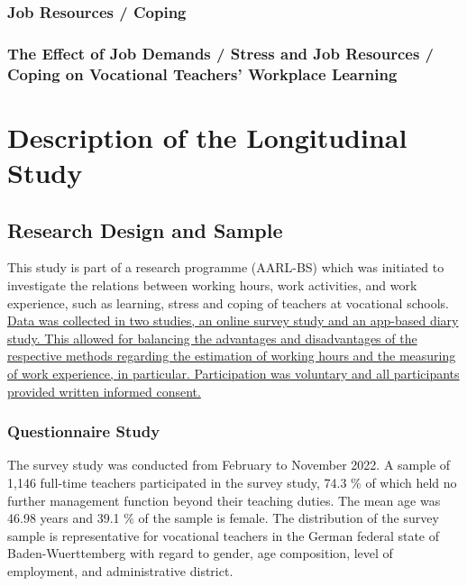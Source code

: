 \documentclass[
]{article}
\begin{document}
\subsubsection{Job Resources / Coping}\label{job-resources-coping}

\subsubsection{The Effect of Job Demands / Stress and Job Resources /
Coping on Vocational Teachers' Workplace
Learning}\label{the-effect-of-job-demands-stress-and-job-resources-coping-on-vocational-teachers-workplace-learning}

\section{Description of the Longitudinal
Study}\label{description-of-the-longitudinal-study}

\subsection{Research Design and
Sample}\label{research-design-and-sample}

This study is part of a research programme (AARL-BS) which was initiated
to investigate the relations between working hours, work activities, and
work experience, such as learning, stress and coping of teachers at
vocational schools. \ul{Data was collected in two studies, an online
survey study and an app-based diary study. This allowed for balancing
the advantages and disadvantages of the respective methods regarding the
estimation of working hours and the measuring of work experience, in
particular. Participation was voluntary and all participants provided
written informed consent.}

\subsubsection{Questionnaire Study}\label{questionnaire-study}

The survey study was conducted from February to November 2022. A sample
of 1,146 full-time teachers participated in the survey study, 74.3 \% of
which held no further management function beyond their teaching duties.
The mean age was 46.98 years and 39.1 \% of the sample is female. The
distribution of the survey sample is representative for vocational
teachers in the German federal state of Baden-Wuerttemberg with regard
to gender, age composition, level of employment, and administrative
district.
\end{document}
